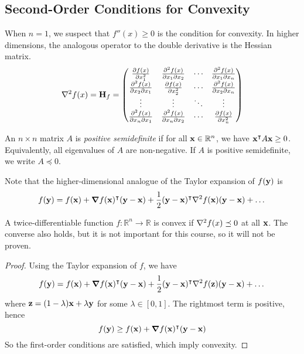 \subsection{Second-Order Conditions for Convexity}
When \(n = 1\), we suspect that \(f''(x) \geq 0\) is the condition for convexity.
In higher dimensions, the analogous operator to the double derivative is the Hessian matrix.
\[ \laplacian{f(x)} = \vb H_f = \begin{pmatrix}
    \pdv{f(x)}{x_1^2} & \pdv{f(x)}{x_1}{x_2} & \cdots & \pdv{f(x)}{x_1}{x_n} \\
    \pdv{f(x)}{x_2}{x_1} & \pdv{f(x)}{x_2^2} & \cdots & \pdv{f(x)}{x_2}{x_n} \\
    \vdots & \vdots & \ddots & \vdots \\
    \pdv{f(x)}{x_n}{x_1} & \pdv{f(x)}{x_n}{x_2} & \cdots & \pdv{f(x)}{x_n^2} \\
\end{pmatrix} \]
\begin{definition}
    An \(n \times n\) matrix \(A\) is \textit{positive semidefinite} if for all \(\vb x \in \mathbb R^n\), we have \(\vb x^\intercal A \vb x \geq 0\). Equivalently, all eigenvalues of \(A\) are non-negative.
    If \(A\) is positive semidefinite, we write \(A \preceq 0\).
\end{definition}
Note that the higher-dimensional analogue of the Taylor expansion of \(f(\vb y)\) is
\[ f(\vb y) = f(\vb x) + \grad{f(\vb x)}^\transpose (\vb y - \vb x) + \frac{1}{2}(\vb y - \vb x)^\transpose \laplacian{f(\vb x)} (\vb y - \vb x) + \dots \]
\begin{theorem}
    A twice-differentiable function \(f \colon \mathbb R^n \to \mathbb R\) is convex if \(\laplacian{f(x)} \preceq 0\) at all \(\vb x\). The converse also holds, but it is not important for this course, so it will not be proven.
\end{theorem}
\begin{proof}
    Using the Taylor expansion of \(f\), we have
    \[ f(\vb y) = f(\vb x) + \grad{f(\vb x)}^\transpose (\vb y - \vb x) + \frac{1}{2}(\vb y - \vb x)^\transpose \laplacian{f(\vb z)} (\vb y - \vb x) + \dots \]
    where \(\vb z = (1-\lambda)\vb x + \lambda \vb y\) for some \(\lambda \in [0, 1]\).
    The rightmost term is positive, hence
    \[ f(\vb y) \geq f(\vb x) + \grad{f(\vb x)}^\intercal (\vb y - \vb x) \]
    So the first-order conditions are satisfied, which imply convexity.
\end{proof}
